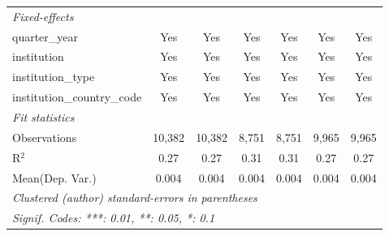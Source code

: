 \begin{tabular}{lcccccc}
   \midrule
   \emph{Fixed-effects}\\
   quarter\_year                      & Yes         & Yes        & Yes     & Yes        & Yes         & Yes\\  
   institution                        & Yes         & Yes        & Yes     & Yes        & Yes         & Yes\\  
   institution\_type                  & Yes         & Yes        & Yes     & Yes        & Yes         & Yes\\  
   institution\_country\_code         & Yes         & Yes        & Yes     & Yes        & Yes         & Yes\\  
   \midrule
   \emph{Fit statistics}\\
   Observations                       & 10,382      & 10,382     & 8,751   & 8,751      & 9,965       & 9,965\\  
   R$^2$                              & 0.27        & 0.27       & 0.31    & 0.31       & 0.27        & 0.27\\  
Mean(Dep. Var.) & 0.004 & 0.004 & 0.004 & 0.004 & 0.004 & 0.004 \\
   \midrule \midrule
   \multicolumn{7}{l}{\emph{Clustered (author) standard-errors in parentheses}}\\
   \multicolumn{7}{l}{\emph{Signif. Codes: ***: 0.01, **: 0.05, *: 0.1}}\\
\end{tabular}
\par\endgroup
